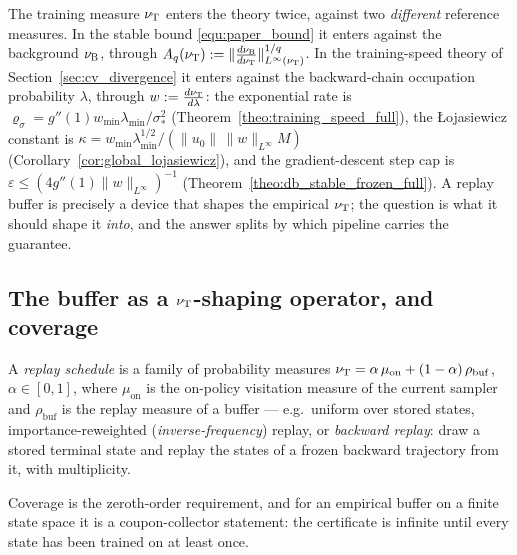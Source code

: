 \section{\appendixDtitle}\label{app:replay}

The training measure $\nu_{\mathrm{T}}$ enters the theory twice, against two \emph{different}
reference measures. In the stable bound \eqref{equ:paper_bound} it enters against the
background $\nu_{\mathrm{B}}$, through $A_q(\nu_{\mathrm{T}}):=\|\frac{d\nu_{\mathrm{B}}}{d\nu_{\mathrm{T}}}\|^{1/q}_{L^\infty(\nu_{\mathrm{T}})}$.
In the training-speed theory of Section~\ref{sec:cv_divergence} it enters against the
backward-chain occupation probability $\lambda$, through $w:=\frac{d\nu_{\mathrm{T}}}{d\lambda}$:
the exponential rate is $\varrho_\sigma=g''(1)w_{\min}\lambda_{\min}/\sigma_*^2$
(Theorem~\ref{theo:training_speed_full}), the \L ojasiewicz constant is
$\kappa=w_{\min}\lambda_{\min}^{1/2}/(\|u_0\|\,\|w\|_{L^\infty}M)$
(Corollary~\ref{cor:global_lojasiewicz}), and the gradient-descent step cap is
$\varepsilon\leq(4g''(1)\|w\|_{L^\infty})^{-1}$
(Theorem~\ref{theo:db_stable_frozen_full}).
A replay buffer is precisely a device that shapes the empirical $\nu_{\mathrm{T}}$; the question
is what it should shape it \emph{into}, and the answer splits by which pipeline carries
the guarantee.

\subsection{The buffer as a $\nu_{\mathrm{T}}$-shaping operator, and coverage}\label{sec:buffer_def}

\begin{definition}\label{def:buffer}
A \emph{replay schedule} is a family of probability measures
$\nu_{\mathrm{T}} = \alpha\,\mu_{\mathrm{on}} + (1-\alpha)\,\rho_{\mathrm{buf}}$, $\alpha\in[0,1]$,
where $\mu_{\mathrm{on}}$ is the on-policy visitation measure of the current sampler and
$\rho_{\mathrm{buf}}$ is the replay measure of a buffer --- e.g.\ uniform over stored
states, importance-reweighted (\emph{inverse-frequency}) replay, or
\emph{backward replay}: draw a stored terminal state and replay the states of a frozen
backward trajectory from it, with multiplicity.
\end{definition}

Coverage is the zeroth-order requirement, and for an empirical buffer on a finite state
space it is a coupon-collector statement: the certificate is infinite until every state
has been trained on at least once.

